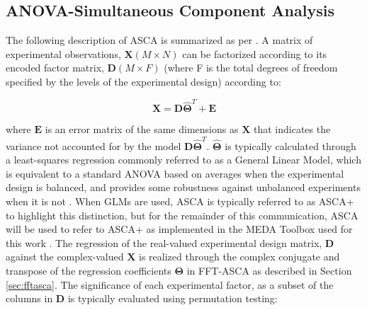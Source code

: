 \documentclass[preprint,12pt]{elsarticle}
\begin{document}

\subsection{ANOVA-Simultaneous Component Analysis}\label{sec:glm}

The following description of ASCA is summarized as per \cite{camacho2023permutation}. A matrix of experimental observations, $\mathbf{X} (M \times N)$ can be factorized according to its encoded factor matrix, $\mathbf{D} (M \times F)$ (where F is the total degrees of freedom specified by the levels of the experimental design) according to:

\begin{equation}
    \mathbf{X} = \mathbf{D} \mathbf{\hat{\Theta}}^T + \mathbf{E}
\end{equation}

\noindent where $\mathbf{E}$ is an error matrix of the same dimensions as $\mathbf{X}$ that indicates the variance not accounted for by the model $\mathbf{D} \mathbf{\hat{\Theta}}^T$. $\mathbf{\hat{\Theta}}$ is typically calculated through a least-squares regression commonly referred to as a General Linear Model, which is equivalent to a standard ANOVA based on averages when the experimental design is balanced, and provides some robustness against unbalanced experiments when it is not \cite{smilde2005anova}. When GLMs are used, ASCA is typically referred to as ASCA+ to highlight this distinction, but for the remainder of this communication, ASCA will be used to refer to ASCA+ as implemented in the MEDA Toolbox used for this work \cite{camacho2015multivariate}. The regression of the real-valued experimental design matrix, $\mathbf{D}$ against the complex-valued $\mathbf{X}$ is realized through the complex conjugate and transpose of the regression coefficients $\mathbf{\Theta}$ in FFT-ASCA as described in Section \ref{sec:fftasca}.  The significance of each experimental factor, as a subset of the columns in $\mathbf{D}$ is typically evaluated using permutation testing:
\end{document}
